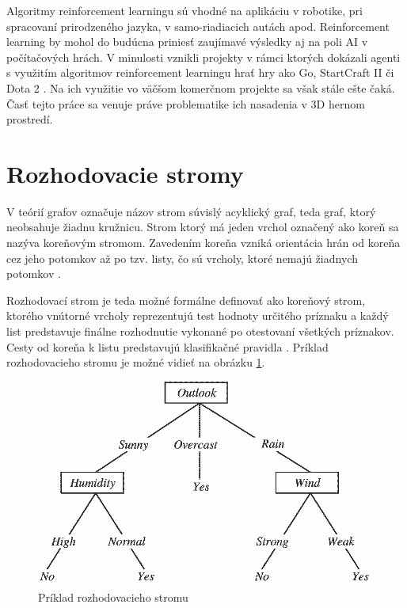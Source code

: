 \documentclass[slovak, master]{diploma}
\begin{document}
\begin{itemize}
  Algoritmy reinforcement learningu sú vhodné na aplikáciu v robotike, pri spracovaní prirodzeného jazyka, v samo-riadiacich autách apod. Reinforcement learning by mohol do budúcna priniesť zaujímavé výsledky aj na poli AI v počítačových hrách. V minulosti vznikli projekty v rámci ktorých dokázali agenti s využitím algoritmov reinforcement learningu hrať hry ako Go, StartCraft II či Dota 2 \cite{app13042443}. Na ich využitie vo väčšom komerčnom projekte sa však stále ešte čaká. Časť tejto práce sa venuje práve problematike ich nasadenia v 3D hernom prostredí.
\end{itemize}

\section{Rozhodovacie stromy}
\label{sec:DecisionTreesOverview}
V teórií grafov označuje názov strom súvislý acyklický graf, teda graf, ktorý neobsahuje žiadnu kružnicu. Strom ktorý má jeden vrchol označený ako koreň sa nazýva koreňovým stromom. Zavedením koreňa vzniká orientácia hrán od koreňa cez jeho potomkov až po tzv. listy, čo sú vrcholy, ktoré nemajú žiadnych potomkov \cite{kovavr2012teorie}. 

Rozhodovací strom je teda možné formálne definovať ako koreňový strom, ktorého vnútorné vrcholy reprezentujú test hodnoty určitého príznaku a každý list predstavuje finálne rozhodnutie vykonané po otestovaní všetkých príznakov. Cesty od koreňa k listu predstavujú klasifikačné pravidla \cite{DecTreeTowards}. Príklad rozhodovacieho stromu je možné vidieť na obrázku \ref{pic:decTreeExample}.

\begin{figure}[!htbp]
    \centering
    \includegraphics[width=.8\textwidth]{Figures/strom.png}
    \caption{Príklad rozhodovacieho stromu \cite{DecTreeTowards}}
    \label{pic:decTreeExample}
\end{figure}
\end{document}
